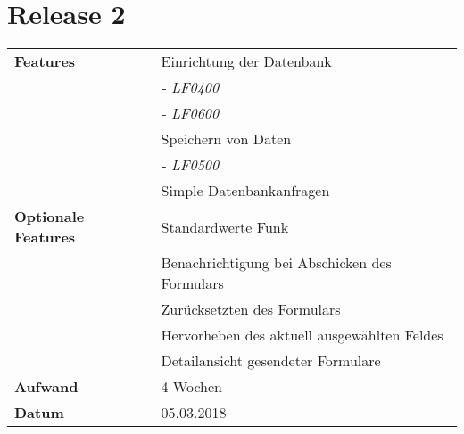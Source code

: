 \section*{Release 2}
\label{sec:release_2}

\begin{tabular}{p{5cm} p{9cm}}
    \textbf{Features} & Einrichtung der Datenbank \\
    & \hspace{8pt} \textit{\footnotesize - LF0400} \\
    & \hspace{8pt} \textit{\footnotesize - LF0600} \\
    & Speichern von Daten \\
    & \hspace{8pt} \textit{\footnotesize - LF0500} \\
    & Simple Datenbankanfragen  \\
    \textbf{Optionale Features} & Standardwerte Funk \\
    & Benachrichtigung bei Abschicken des Formulars \\
    & Zurücksetzten des Formulars \\
    & Hervorheben des aktuell ausgewählten Feldes \\
    & Detailansicht gesendeter Formulare \\
    \hline
    \textbf{Aufwand} & 4 Wochen\\
    \hline
    \textbf{Datum} & 05.03.2018
\end{tabular}
